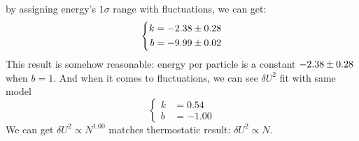 \documentclass[UTF8,a4paper]{article}
\begin{document}
by assigning energy's $1\sigma$ range with fluctuations, we can get:
\begin{equation}
	\left\{
	\begin{aligned}
		k & = \num[separate-uncertainty = true]{-2.38+-0.28} \\
		b & = \num[separate-uncertainty = true]{-9.99+-0.02}
	\end{aligned}
	\right.
\end{equation}
This result is somehow reasonable: energy per particle is a constant $\num[separate-uncertainty = true]{-2.38+-0.28}$ when $b = 1$. And when it comes to fluctuations, we can see $\delta U^2$ fit with same model
\begin{equation}
	\left\{
	\begin{aligned}
		k & = 0.54  \\
		b & = -1.00
	\end{aligned}
	\right.
\end{equation}
We can get $\delta U^2\propto N^{1.00}$ matches thermostatic result: $\delta U^2\propto N$.
\end{document}
